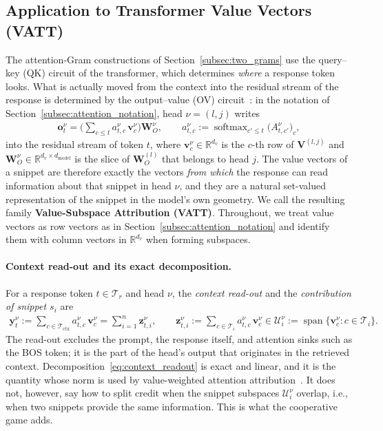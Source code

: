 \documentclass{article}
\begin{document}
\subsection{Application to Transformer Value Vectors (VATT)}
\label{subsec:vatt}

The attention-Gram constructions of Section~\ref{subsec:two_grams} use the query--key (QK) circuit of the transformer, which determines \emph{where} a response token looks. What is actually moved from the context into the residual stream of the response is determined by the output--value (OV) circuit~\cite{elhage2021mathematical}: in the notation of Section~\ref{subsec:attention_notation}, head $\nu = (l, j)$ writes
\begin{align}\label{eq:head_output}
    \mathbf{o}^{\nu}_t = \Big( \sum_{c \le t} a^{\nu}_{t,c} \, \mathbf{v}^{\nu}_c \Big) \mathbf{W}_O^{\nu}, \qquad a^{\nu}_{t,c} := \operatorname{softmax}_{c' \le t}\big(A^{\nu}_{t,c'}\big)_c,
\end{align}
into the residual stream of token $t$, where $\mathbf{v}^\nu_c \in \mathbb{R}^{d_v}$ is the $c$-th row of $\mathbf{V}^{(l,j)}$ and $\mathbf{W}_O^{\nu} \in \mathbb{R}^{d_v \times d_{\text{model}}}$ is the slice of $\mathbf{W}_O^{(l)}$ that belongs to head $j$. The value vectors of a snippet are therefore exactly the vectors \emph{from which} the response can read information about that snippet in head $\nu$, and they are a natural set-valued representation of the snippet in the model's own geometry. We call the resulting family \textbf{Value-Subspace Attribution (VATT)}. Throughout, we treat value vectors as row vectors as in Section~\ref{subsec:attention_notation} and identify them with column vectors in $\mathbb{R}^{d_v}$ when forming subspaces.

\paragraph{Context read-out and its exact decomposition.}
For a response token $t \in \mathcal{T}_r$ and head $\nu$, the \emph{context read-out} and the \emph{contribution of snippet $s_i$} are
\begin{align}\label{eq:context_readout}
    \mathbf{y}^{\nu}_t := \sum_{c \in \mathcal{T}_{\text{ctx}}} a^{\nu}_{t,c} \, \mathbf{v}^{\nu}_c = \sum_{i=1}^{n} \mathbf{z}^{\nu}_{t,i}, \qquad \mathbf{z}^{\nu}_{t,i} := \sum_{c \in \mathcal{T}_i} a^{\nu}_{t,c} \, \mathbf{v}^{\nu}_c \in \mathcal{U}^{\nu}_i := \operatorname{span}\{\mathbf{v}^{\nu}_c : c \in \mathcal{T}_i\}.
\end{align}
The read-out excludes the prompt, the response itself, and attention sinks such as the BOS token; it is the part of the head's output that originates in the retrieved context. Decomposition~\eqref{eq:context_readout} is exact and linear, and it is the quantity whose norm is used by value-weighted attention attribution~\cite{kobayashi2020attention}. It does not, however, say how to split credit when the snippet subspaces $\mathcal{U}^\nu_i$ overlap, i.e., when two snippets provide the same information. This is what the cooperative game adds.
\end{document}
